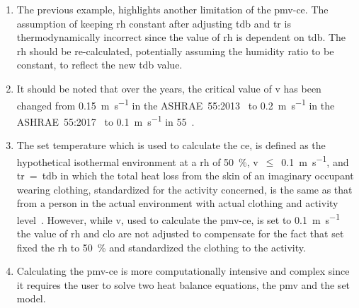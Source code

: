 \begin{enumerate}
    \item The previous example, highlights another limitation of the \ac{pmv-ce}.
    The assumption of keeping \ac{rh} constant after adjusting \ac{tdb} and \ac{tr} is thermodynamically incorrect since the value of \ac{rh} is dependent on \ac{tdb}.
    The \ac{rh} should be re-calculated, potentially assuming the humidity ratio to be constant, to reflect the new \ac{tdb} value.
    \item It should be noted that over the years, the critical value of \ac{v} has been changed from \qty{0.15}{\m\per\s} in the ASHRAE~55:2013~\cite{ASHRAE552013} to \qty{0.2}{\m\per\s} in the ASHRAE~55:2017~\cite{ASHRAE552017, arens_moving_2009} to \qty{0.1}{\m\per\s} in \gls{55}~\cite{ashrae552023}.
    \item The \ac{set} temperature which is used to calculate the \ac{ce}, is defined as the hypothetical isothermal environment at a \ac{rh} of \qty{50}{\percent}, \ac{v}~$\leq$~\qty{0.1}{\m\per\s}, and \ac{tr}~=~\ac{tdb} in which the total heat loss from the skin of an imaginary occupant wearing clothing, standardized for the activity concerned, is the same as that from a person in the actual environment with actual clothing and activity level~\cite{ashrae552023}.
    However, while \ac{v}, used to calculate the \ac{pmv-ce}, is set to \qty{0.1}{\m\per\s} the value of \ac{rh} and \ac{clo} are not adjusted to compensate for the fact that \ac{set} fixed the \ac{rh} to \qty{50}{\percent} and standardized the clothing to the activity.
    \item Calculating the \ac{pmv-ce} is more computationally intensive and complex since it requires the user to solve two heat balance equations, the \ac{pmv} and the \ac{set} model.
\end{enumerate}

